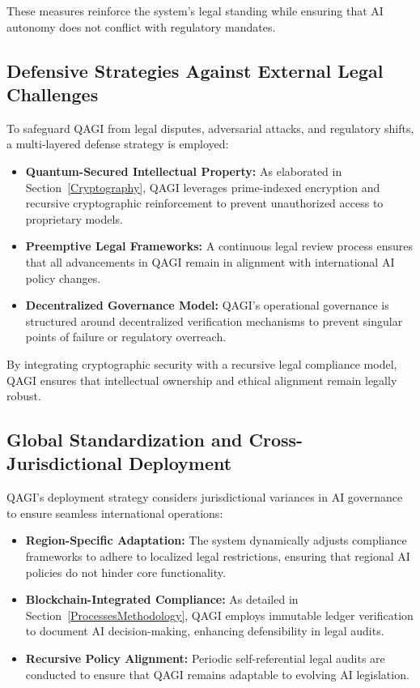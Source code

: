 \documentclass{article}
\theoremstyle{plain}
\theoremstyle{claimstyle}
\begin{document}
These measures reinforce the system’s legal standing while ensuring that AI autonomy does not conflict with regulatory mandates.

\subsection{Defensive Strategies Against External Legal Challenges}

To safeguard QAGI from legal disputes, adversarial attacks, and regulatory shifts, a multi-layered defense strategy is employed:
\begin{itemize}
    \item \textbf{Quantum-Secured Intellectual Property:} As elaborated in Section~\ref{Cryptography}, QAGI leverages prime-indexed encryption and recursive cryptographic reinforcement to prevent unauthorized access to proprietary models.
    \item \textbf{Preemptive Legal Frameworks:} A continuous legal review process ensures that all advancements in QAGI remain in alignment with international AI policy changes.
    \item \textbf{Decentralized Governance Model:} QAGI’s operational governance is structured around decentralized verification mechanisms to prevent singular points of failure or regulatory overreach.
\end{itemize}

By integrating cryptographic security with a recursive legal compliance model, QAGI ensures that intellectual ownership and ethical alignment remain legally robust.

\subsection{Global Standardization and Cross-Jurisdictional Deployment}

QAGI’s deployment strategy considers jurisdictional variances in AI governance to ensure seamless international operations:
\begin{itemize}
    \item \textbf{Region-Specific Adaptation:} The system dynamically adjusts compliance frameworks to adhere to localized legal restrictions, ensuring that regional AI policies do not hinder core functionality.
    \item \textbf{Blockchain-Integrated Compliance:} As detailed in Section~\ref{ProcessesMethodology}, QAGI employs immutable ledger verification to document AI decision-making, enhancing defensibility in legal audits.
    \item \textbf{Recursive Policy Alignment:} Periodic self-referential legal audits are conducted to ensure that QAGI remains adaptable to evolving AI legislation.
\end{itemize}
\end{document}
